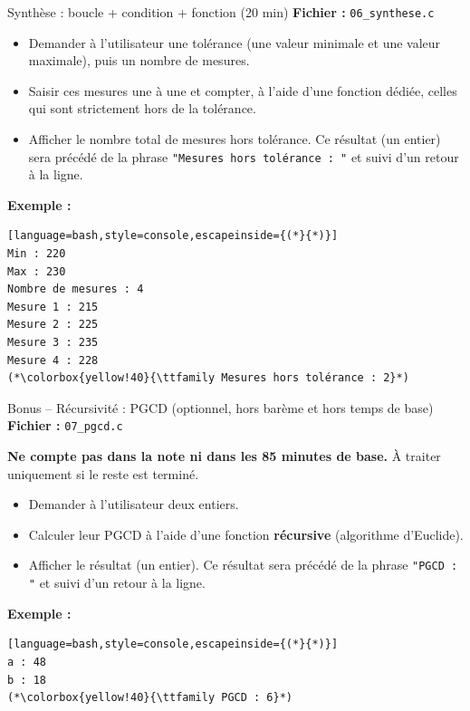 \begin{UPSTIexercice}{Synthèse : boucle + condition + fonction (20 min)}
  \textbf{Fichier :} \texttt{06\_synthese.c}
  \begin{itemize}
    \item Demander à l'utilisateur une tolérance (une valeur minimale et une valeur maximale), puis un nombre de mesures.
    \item Saisir ces mesures une à une et compter, à l'aide d'une fonction dédiée, celles qui sont strictement hors de la tolérance.
    \item Afficher le nombre total de mesures hors tolérance. Ce résultat (un entier) sera précédé de la phrase \texttt{"Mesures hors tolérance : "} et suivi d'un retour à la ligne.
  \end{itemize}

  \textbf{Exemple :}
  \begin{lstlisting}[language=bash,style=console,escapeinside={(*}{*)}]
Min : 220
Max : 230
Nombre de mesures : 4
Mesure 1 : 215
Mesure 2 : 225
Mesure 3 : 235
Mesure 4 : 228
(*\colorbox{yellow!40}{\ttfamily Mesures hors tolérance : 2}*)
  \end{lstlisting}
\end{UPSTIexercice}

\begin{UPSTIexercice}{Bonus -- Récursivité : PGCD (optionnel, hors barème et hors temps de base)}
  \textbf{Fichier :} \texttt{07\_pgcd.c}

  \textbf{Ne compte pas dans la note ni dans les 85 minutes de base.} À traiter uniquement si le reste est terminé.
  \begin{itemize}
    \item Demander à l'utilisateur deux entiers.
    \item Calculer leur PGCD à l'aide d'une fonction \textbf{récursive} (algorithme d'Euclide).
    \item Afficher le résultat (un entier). Ce résultat sera précédé de la phrase \texttt{"PGCD : "} et suivi d'un retour à la ligne.
  \end{itemize}

  \textbf{Exemple :}
  \begin{lstlisting}[language=bash,style=console,escapeinside={(*}{*)}]
a : 48
b : 18
(*\colorbox{yellow!40}{\ttfamily PGCD : 6}*)
  \end{lstlisting}
\end{UPSTIexercice}

